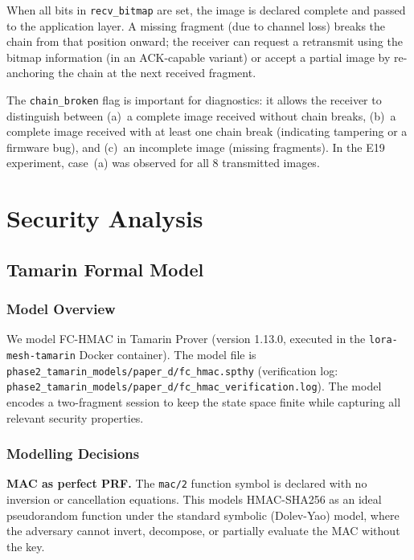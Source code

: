 \documentclass[journal]{IEEEtran}
\begin{document}
When all bits in \texttt{recv\_bitmap} are set, the image is declared complete
and passed to the application layer.  A missing fragment (due to channel loss)
breaks the chain from that position onward; the receiver can request a
retransmit using the bitmap information (in an ACK-capable variant) or accept
a partial image by re-anchoring the chain at the next received fragment.

The \texttt{chain\_broken} flag is important for diagnostics: it allows the
receiver to distinguish between (a)~a complete image received without chain
breaks, (b)~a complete image received with at least one chain break (indicating
tampering or a firmware bug), and (c)~an incomplete image (missing fragments).
In the E19 experiment, case~(a) was observed for all 8 transmitted images.

\section{Security Analysis}
\label{sec:security}

\subsection{Tamarin Formal Model}
\label{sec:tamarin}

\subsubsection{Model Overview}

We model FC-HMAC in Tamarin Prover \cite{tamarin_prover} (version 1.13.0,
executed in the \texttt{lora-mesh-tamarin} Docker container).  The model file
is \texttt{phase2\_tamarin\_models/paper\_d/fc\_hmac.spthy} (verification log:
\texttt{phase2\_tamarin\_models/paper\_d/fc\_hmac\_verification.log}).  The
model encodes a two-fragment session to keep the state space finite while
capturing all relevant security properties.

\subsubsection{Modelling Decisions}

\textbf{MAC as perfect PRF.}  The \texttt{mac/2} function symbol is declared
with no inversion or cancellation equations.  This models HMAC-SHA256 as an
ideal pseudorandom function under the standard symbolic (Dolev-Yao) model,
where the adversary cannot invert, decompose, or partially evaluate the MAC
without the key.
\end{document}
